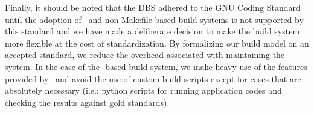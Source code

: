 
Finally, it should be noted that the DBS adhered to the GNU Coding
Standard~\cite{gnu}  until the adoption of
\cmake\ and non-Makefile based build systems is not supported by this
standard and we have made a deliberate decision to make the build
system more flexible at the cost of standardization.  By formalizing
our build model on an accepted standard, we reduce the overhead
associated with maintaining the system. In the case of the
\cmake-based build system, we make heavy use of the features provided
by \cmake\ and avoid the use of custom build scripts except for cases
that are absolutely necessary (i.e.: python scripts for running
application codes and checking the results against gold standards).

%
%

